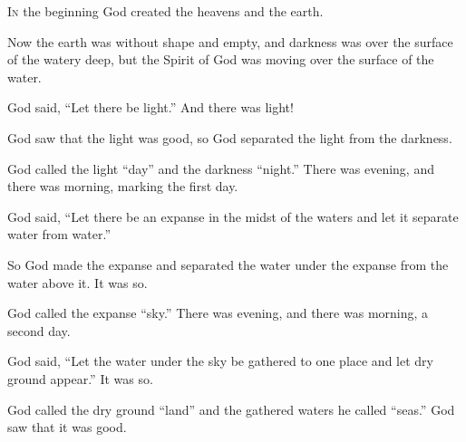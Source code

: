 \begin{scripture}

 \allowchapbreak\hypertarget{ch-genesis-1}{}\lettrine[lines=8]{\color{pentateuch}I}{\textsc{n}} the beginning God created the heavens and the earth.\everypar{}
\\\indent{} Now the earth was without shape and empty, and darkness was over the surface of the watery deep, but the Spirit of God was moving over the surface of the water.
 God said, ``Let there be light.'' And there was light!
 God saw that the light was good, so God separated the light from the darkness.
 God called the light ``day'' and the darkness ``night.'' There was evening, and there was morning, marking the first day.
\\\indent{} God said, ``Let there be an expanse in the midst of the waters and let it separate water from water.''
 So God made the expanse and separated the water under the expanse from the water above it. It was so.
 God called the expanse ``sky.'' There was evening, and there was morning, a second day.
\everypar{}

 God said, ``Let the water under the sky be gathered to one place and let dry ground appear.'' It was so.
 God called the dry ground ``land'' and the gathered waters he called ``seas.'' God saw that it was good.
\everypar{}


\end{scripture}
